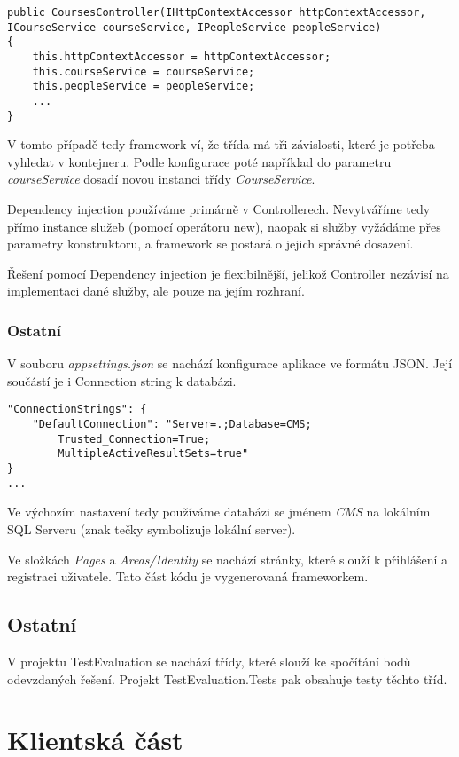 \begin{lstlisting}
public CoursesController(IHttpContextAccessor httpContextAccessor, ICourseService courseService, IPeopleService peopleService)
{
	this.httpContextAccessor = httpContextAccessor;
	this.courseService = courseService;
	this.peopleService = peopleService;
	...
}
\end{lstlisting}
V tomto případě tedy framework ví, že třída má tři závislosti, které je potřeba vyhledat v kontejneru.
Podle konfigurace poté například do parametru \textit{courseService} dosadí novou instanci třídy \textit{CourseService}. 

Dependency injection používáme primárně v Controllerech.
Nevytváříme tedy přímo instance služeb (pomocí operátoru new), naopak si služby vyžádáme přes parametry konstruktoru, a framework se postará o jejich správné dosazení.

Řešení pomocí Dependency injection je flexibilnější, jelikož Controller nezávisí na implementaci dané služby, ale pouze na jejím rozhraní.

\subsubsection*{Ostatní}

V souboru \textit{appsettings.json} se nachází konfigurace aplikace ve formátu JSON. Její součástí je i Connection string k databázi. 
\begin{lstlisting}
"ConnectionStrings": {
	"DefaultConnection": "Server=.;Database=CMS;
		Trusted_Connection=True;
		MultipleActiveResultSets=true" 
}
...
\end{lstlisting}

Ve výchozím nastavení tedy používáme databázi se jménem \textit{CMS} na lokálním SQL Serveru (znak tečky symbolizuje lokální server).

Ve složkách \textit{Pages} a \textit{Areas/Identity} se nachází stránky, které slouží k přihlášení a registraci uživatele. Tato část kódu je vygenerovaná frameworkem.


\subsection{Ostatní}

V projektu TestEvaluation se nachází třídy, které slouží ke spočítání bodů odevzdaných řešení. Projekt TestEvaluation.Tests pak obsahuje testy těchto tříd.

\section{Klientská část}
\lstset{style=typescript}

